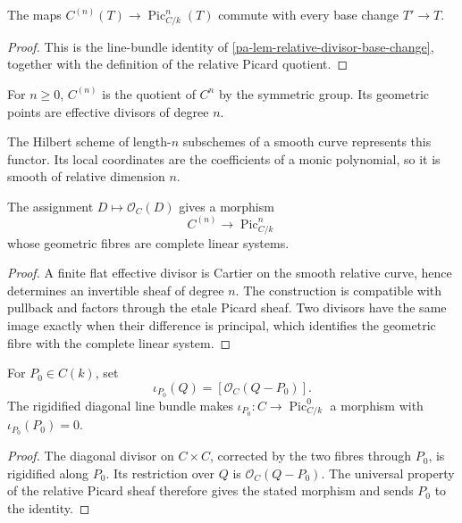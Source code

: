 \begin{proposition}
  \label{pa-prop-effective-map-natural}
  \cite{kleiman-picard}
  The maps \(C^{(n)}(T)\to\operatorname{Pic}^n_{C/k}(T)\) commute with every
  base change \(T'\to T\).
\end{proposition}

\begin{proof}
  This is the line-bundle identity of
  \ref{pa-lem-relative-divisor-base-change}, together with the definition of
  the relative Picard quotient.
\end{proof}

\begin{definition}
  \label{pa-def-symmetric-power}
  \cite{milne-av,kleiman-picard}
  For \(n\ge0\), \(C^{(n)}\) is the quotient of \(C^n\) by the symmetric group.
  Its geometric points are effective divisors of degree \(n\).
\end{definition}

The Hilbert scheme of length-\(n\) subschemes of a smooth curve represents
this functor.  Its local coordinates are the coefficients of a monic
polynomial, so it is smooth of relative dimension \(n\).

\begin{proposition}
  \label{pa-prop-effective-map}
  \cite[Thm.~3.7]{kleiman-picard}
  The assignment \(D\mapsto\mathcal O_C(D)\) gives a morphism
  \[
    C^{(n)}\longrightarrow\operatorname{Pic}^n_{C/k}
  \]
  whose geometric fibres are complete linear systems.
\end{proposition}

\begin{proof}
  A finite flat effective divisor is Cartier on the smooth relative curve,
  hence determines an invertible sheaf of degree \(n\).  The construction is
  compatible with pullback and factors through the etale Picard sheaf.  Two
  divisors have the same image exactly when their difference is principal,
  which identifies the geometric fibre with the complete linear system.
\end{proof}

\begin{definition}
  \label{pa-def-abel-jacobi}
  \cite{milne-av,kleiman-picard}
  For \(P_0\in C(k)\), set
  \[
    \iota_{P_0}(Q)=[\mathcal O_C(Q-P_0)].
  \]
  The rigidified diagonal line bundle makes
  \(\iota_{P_0}:C\to\operatorname{Pic}^0_{C/k}\) a morphism with
  \(\iota_{P_0}(P_0)=0\).
\end{definition}

\begin{proof}
  The diagonal divisor on \(C\times C\), corrected by the two fibres through
  \(P_0\), is rigidified along \(P_0\).  Its restriction over \(Q\) is
  \(\mathcal O_C(Q-P_0)\).  The universal property of the relative Picard
  sheaf therefore gives the stated morphism and sends \(P_0\) to the identity.
\end{proof}
